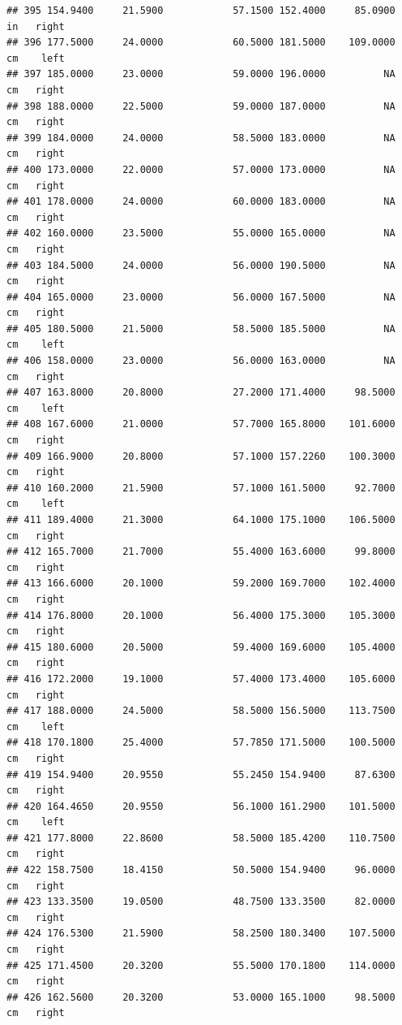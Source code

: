 \documentclass[]{article}
\begin{document}
\begin{verbatim}
## 395 154.9400     21.5900            57.1500 152.4000     85.0900     in   right
## 396 177.5000     24.0000            60.5000 181.5000    109.0000     cm    left
## 397 185.0000     23.0000            59.0000 196.0000          NA     cm   right
## 398 188.0000     22.5000            59.0000 187.0000          NA     cm   right
## 399 184.0000     24.0000            58.5000 183.0000          NA     cm   right
## 400 173.0000     22.0000            57.0000 173.0000          NA     cm   right
## 401 178.0000     24.0000            60.0000 183.0000          NA     cm   right
## 402 160.0000     23.5000            55.0000 165.0000          NA     cm   right
## 403 184.5000     24.0000            56.0000 190.5000          NA     cm   right
## 404 165.0000     23.0000            56.0000 167.5000          NA     cm   right
## 405 180.5000     21.5000            58.5000 185.5000          NA     cm    left
## 406 158.0000     23.0000            56.0000 163.0000          NA     cm   right
## 407 163.8000     20.8000            27.2000 171.4000     98.5000     cm    left
## 408 167.6000     21.0000            57.7000 165.8000    101.6000     cm   right
## 409 166.9000     20.8000            57.1000 157.2260    100.3000     cm   right
## 410 160.2000     21.5900            57.1000 161.5000     92.7000     cm    left
## 411 189.4000     21.3000            64.1000 175.1000    106.5000     cm   right
## 412 165.7000     21.7000            55.4000 163.6000     99.8000     cm   right
## 413 166.6000     20.1000            59.2000 169.7000    102.4000     cm   right
## 414 176.8000     20.1000            56.4000 175.3000    105.3000     cm   right
## 415 180.6000     20.5000            59.4000 169.6000    105.4000     cm   right
## 416 172.2000     19.1000            57.4000 173.4000    105.6000     cm   right
## 417 188.0000     24.5000            58.5000 156.5000    113.7500     cm    left
## 418 170.1800     25.4000            57.7850 171.5000    100.5000     cm   right
## 419 154.9400     20.9550            55.2450 154.9400     87.6300     cm   right
## 420 164.4650     20.9550            56.1000 161.2900    101.5000     cm    left
## 421 177.8000     22.8600            58.5000 185.4200    110.7500     cm   right
## 422 158.7500     18.4150            50.5000 154.9400     96.0000     cm   right
## 423 133.3500     19.0500            48.7500 133.3500     82.0000     cm   right
## 424 176.5300     21.5900            58.2500 180.3400    107.5000     cm   right
## 425 171.4500     20.3200            55.5000 170.1800    114.0000     cm   right
## 426 162.5600     20.3200            53.0000 165.1000     98.5000     cm   right

\end{verbatim}
\end{document}
